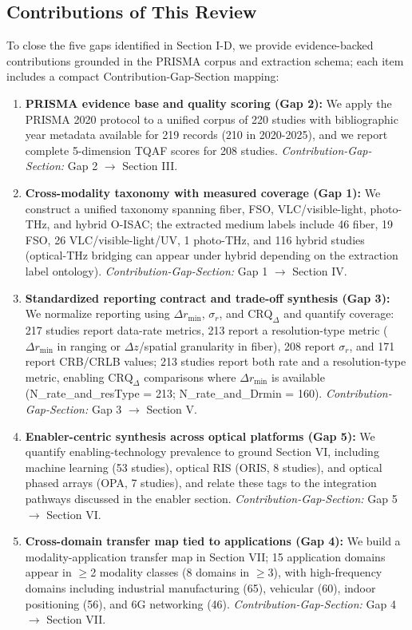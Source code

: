 \subsection{Contributions of This Review}

To close the five gaps identified in Section I-D, we provide evidence-backed contributions grounded in the PRISMA corpus and extraction schema; each item includes a compact Contribution-Gap-Section mapping:

\begin{enumerate}
    \item \textbf{PRISMA evidence base and quality scoring (Gap 2):} We apply the PRISMA 2020 protocol \cite{PRISMA2020} to a unified corpus of 220 studies with bibliographic year metadata available for 219 records (210 in 2020-2025), and we report complete 5-dimension TQAF scores for 208 studies. \textit{Contribution-Gap-Section:} Gap 2 $\rightarrow$ Section III.
    \item \textbf{Cross-modality taxonomy with measured coverage (Gap 1):} We construct a unified taxonomy spanning fiber, FSO, VLC/visible-light, photo-THz, and hybrid O-ISAC; the extracted medium labels include 46 fiber, 19 FSO, 26 VLC/visible-light/UV, 1 photo-THz, and 116 hybrid studies (optical-THz bridging can appear under hybrid depending on the extraction label ontology). \textit{Contribution-Gap-Section:} Gap 1 $\rightarrow$ Section IV.
    \item \textbf{Standardized reporting contract and trade-off synthesis (Gap 3):} We normalize reporting using $\Delta r_{\min}$, $\sigma_r$, and $\text{CRQ}_{\Delta}$ and quantify coverage: 217 studies report data-rate metrics, 213 report a resolution-type metric ($\Delta r_{\min}$ in ranging or $\Delta z$/spatial granularity in fiber), 208 report $\sigma_r$, and 171 report CRB/CRLB values; 213 studies report both rate and a resolution-type metric, enabling $\text{CRQ}_{\Delta}$ comparisons where $\Delta r_{\min}$ is available (N\_rate\_and\_resType = 213; N\_rate\_and\_Drmin = 160). \textit{Contribution-Gap-Section:} Gap 3 $\rightarrow$ Section V.
    \item \textbf{Enabler-centric synthesis across optical platforms (Gap 5):} We quantify enabling-technology prevalence to ground Section VI, including machine learning (53 studies), optical RIS (ORIS, 8 studies), and optical phased arrays (OPA, 7 studies), and relate these tags to the integration pathways discussed in the enabler section. \textit{Contribution-Gap-Section:} Gap 5 $\rightarrow$ Section VI.
    \item \textbf{Cross-domain transfer map tied to applications (Gap 4):} We build a modality-application transfer map in Section VII; 15 application domains appear in $\ge$2 modality classes (8 domains in $\ge$3), with high-frequency domains including industrial manufacturing (65), vehicular (60), indoor positioning (56), and 6G networking (46). \textit{Contribution-Gap-Section:} Gap 4 $\rightarrow$ Section VII.
\end{enumerate}

